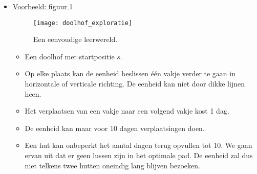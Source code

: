 \begin{itemize}
	\begin{enumerate}
		\item \begin{itemize}		
			\item De staat komt overeen met de visie.
			\item Er is een één op één relatie tussen A en S, waarbij $k = n$ en $U$ een diagonaalmatrix waarbij alle diagonaalelementen 1 zijn.
			\item Noteer $\tau(s) = d$ als een strategie $\tau$ die in staat $s$ beslissing $d$ neemt.
			\item Dit zorgt ervoor dat dat de H uit \gls{ac:hmdm} mag wegvallen.
			\end{itemize}
		\item \begin{itemize}
			\item De overgang naar de volgende staat is helemaal gedetermineerd door de beslissing. 
			\item Elke $T(d)_{ij}$ is ofwel 1 ofwel 0. 
			\item De transitie kan uitgedrukt worden als $T(d, s) = s'$ als $d$ leidt tot een overgang naar staat $s'$.
			\item We krijgen een deterministisch systeem waarbij een staat $s$ in één tijdsstap overgaat in de staat $T(\tau(s), s)$.
	\end{itemize}
	\end{enumerate}
	\item \underline{Voorbeeld: figuur \ref{fig:doolhof_exploratie}} 
	\begin{figure}[ht]
		\texttt{[image: doolhof\_exploratie]}
		\caption{Een eenvoudige leerwereld.}
		\label{fig:doolhof_exploratie}
	\end{figure}
	\begin{itemize}
		\item Een doolhof met startpositie $s$.
		\item Op elke plaats kan de eenheid beslissen één vakje verder te gaan in horizontale of verticale richting. De eenheid kan niet door dikke lijnen heen.
		\item Het verplaatsen van een vakje naar een volgend vakje kost 1 dag.
		\item De eenheid kan maar voor 10 dagen verplaatsingen doen.
		\item Een hut kan onbeperkt het aantal dagen terug opvullen tot 10.
		\alert We gaan ervan uit dat er geen lussen zijn in het optimale pad. De eenheid zal dus niet telkens twee hutten oneindig lang blijven bezoeken.

\end{itemize}
\end{itemize}
